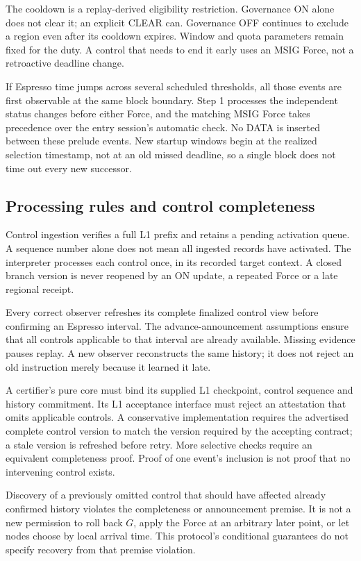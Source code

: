 \documentclass[11pt,a4paper]{article}
\newcounter{protocol}
\begin{document}
The cooldown is a replay-derived eligibility restriction. Governance ON
alone does not clear it; an explicit CLEAR can. Governance OFF continues
to exclude a region even after its cooldown expires.
Window and quota parameters remain fixed for the duty. A control that
needs to end it early uses an MSIG Force, not a retroactive deadline
change.

If Espresso time jumps across several scheduled thresholds, all those
events are first observable at the same block boundary. Step 1 processes
the independent status changes before either Force, and the matching
MSIG Force takes precedence over the entry session's automatic check.
No DATA is inserted between these prelude events. New startup windows
begin at the realized selection timestamp, not at an old missed
deadline, so a single block does not time out every new successor.

\subsection{Processing rules and control completeness}
\label{sec:control-completeness}
Control ingestion verifies a full L1 prefix and retains a pending
activation queue. A sequence number alone does not mean all ingested
records have activated. The interpreter processes each control once,
in its recorded target context. A closed branch version is never reopened by
an ON update, a repeated Force or a late regional receipt.

Every correct observer refreshes its complete finalized control view
before confirming an Espresso interval. The advance-announcement
assumptions ensure that all controls applicable to that interval are
already available. Missing evidence pauses replay. A new observer
reconstructs the same history; it does not reject an old instruction
merely because it learned it late.

A certifier's pure core must bind its supplied L1 checkpoint, control
sequence and history commitment. Its L1 acceptance interface must
reject an attestation that omits applicable controls. A conservative
implementation requires the advertised complete control version to
match the version required by the accepting contract; a stale version
is refreshed before retry. More selective checks require an equivalent
completeness proof. Proof of one event's inclusion is not proof that
no intervening control exists.

Discovery of a previously omitted control that should have affected
already confirmed history violates the completeness or announcement
premise. It is not a new permission to roll back $G$, apply the Force
at an arbitrary later point, or let nodes choose by local arrival time.
This protocol's conditional guarantees do not specify recovery from
that premise violation.
\end{document}
